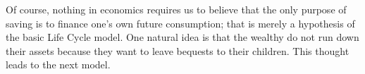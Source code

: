 \documentclass[titlepage,12pt]{article}
\begin{document}
\hypertarget{WealthFalls}{}

\hypertarget{OldRichDontDissave}{}

Of course, nothing in economics requires us to believe that the only 
purpose of saving is to finance one's own future consumption; that is 
merely a hypothesis of the basic Life Cycle model.  One natural idea is 
that the wealthy do not run down their assets because they want to 
leave bequests to their children.  This thought leads to the next model.
\end{document}
